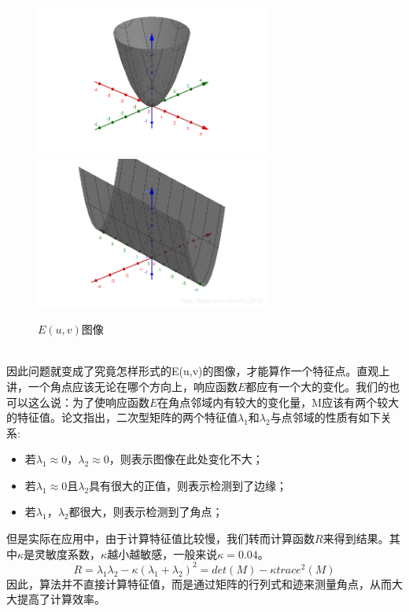 \begin{figure}[htbp]
\includegraphics[height=5cm]{figures/ercixing.png}
\includegraphics[height=5cm]{figures/ercixing1.png}
\caption{$E(u,v)$图像}
\label{ercixing}
\end{figure}\\
因此问题就变成了究竟怎样形式的E(u,v)的图像，才能算作一个特征点。直观上讲，一个角点应该无论在哪个方向上，响应函数$E$都应有一个大的变化。我们的也可以这么说：为了使响应函数$E$在角点邻域内有较大的变化量，M应该有两个较大的特征值。论文\cite{harris1988combined}指出，二次型矩阵的两个特征值$\lambda_1$和$\lambda_2$与点邻域的性质有如下关系:
\begin{itemize}
	\item 若$\lambda_1 \approx 0$，$\lambda_2\approx 0$，则表示图像在此处变化不大；
	
	\item 若$\lambda_1 \approx 0$且$\lambda_2$具有很大的正值，则表示检测到了边缘；
	
	\item 若$\lambda_1$，$\lambda_2$都很大，则表示检测到了角点；
\end{itemize}
但是实际在应用中，由于计算特征值比较慢，我们转而计算函数$R$来得到结果。其中$\kappa$是灵敏度系数，$\kappa$越小越敏感，一般来说$\kappa=0.04$。
\begin{equation}
	R = \lambda_1\lambda_2-\kappa(\lambda_1+\lambda_2)^2=det(M)-\kappa trace^2(M)
\end{equation}
因此，算法并不直接计算特征值，而是通过矩阵的行列式和迹来测量角点，从而大大提高了计算效率。\par
